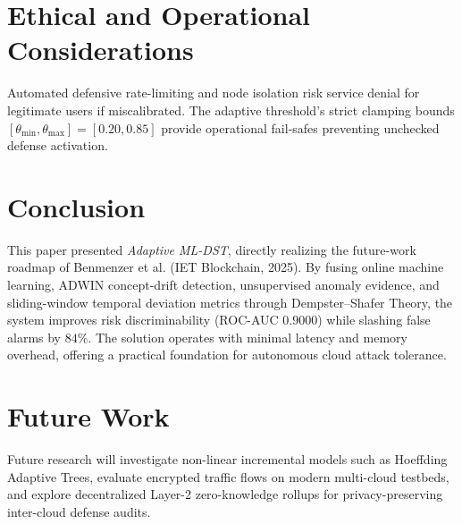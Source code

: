 \documentclass[conference]{IEEEtran}
\begin{document}
\section{Ethical and Operational Considerations}
Automated defensive rate-limiting and node isolation risk service denial for legitimate users if miscalibrated. The adaptive threshold's strict clamping bounds $[\theta_{\min}, \theta_{\max}] = [0.20, 0.85]$ provide operational fail-safes preventing unchecked defense activation.

\section{Conclusion}
This paper presented \textit{Adaptive ML-DST}, directly realizing the future-work roadmap of Benmenzer et al. (IET Blockchain, 2025). By fusing online machine learning, ADWIN concept-drift detection, unsupervised anomaly evidence, and sliding-window temporal deviation metrics through Dempster--Shafer Theory, the system improves risk discriminability (ROC-AUC $0.9000$) while slashing false alarms by $84\%$. The solution operates with minimal latency and memory overhead, offering a practical foundation for autonomous cloud attack tolerance.

\section{Future Work}
Future research will investigate non-linear incremental models such as Hoeffding Adaptive Trees, evaluate encrypted traffic flows on modern multi-cloud testbeds, and explore decentralized Layer-2 zero-knowledge rollups for privacy-preserving inter-cloud defense audits.



\end{document}
